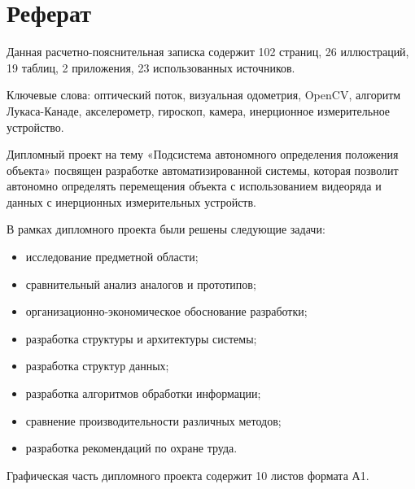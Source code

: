 \newpage
\section*{Реферат}


Данная расчетно-пояснительная записка содержит 102 страниц, 26 иллюстраций, 19 таблиц, 2 приложения, 23 использованных источников.

Ключевые слова: оптический поток, визуальная одометрия, OpenCV, алгоритм Лукаса-Канаде, акселерометр, гироскоп, камера, инерционное измерительное устройство. 

Дипломный проект на тему «Подсистема автономного определения положения объекта» посвящен разработке автоматизированной системы, которая позволит автономно определять перемещения объекта с использованием видеоряда и данных с инерционных измерительных устройств.

В рамках дипломного проекта были решены следующие задачи:
\begin{itemize}
\item исследование предметной области;
\item сравнительный анализ аналогов и прототипов;
\item организационно-экономическое обоснование разработки;
\item разработка структуры и архитектуры системы;
\item разработка структур данных;
\item разработка алгоритмов обработки информации;
\item сравнение производительности различных методов;
\item разработка рекомендаций по охране труда.
\end{itemize}

Графическая часть дипломного проекта содержит 10 листов формата А1.



